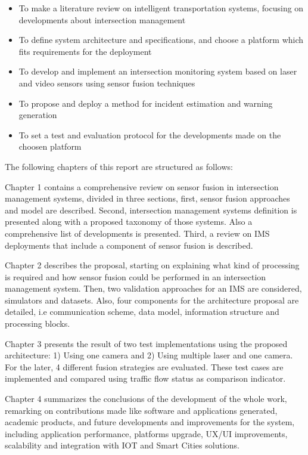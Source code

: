 \begin{itemize}
\item To make a literature review on intelligent transportation systems, focusing on developments about intersection management
\item To define system architecture and specifications, and choose a platform which fits requirements for the deployment
\item To develop and implement an intersection monitoring system based on laser and video sensors using sensor fusion techniques
\item To propose and deploy a method for incident estimation and warning generation
\item To set a test and evaluation protocol for the developments made on the choosen platform 
\end{itemize}


The following chapters of this report are structured as follows:

Chapter 1 contains a comprehensive review on sensor fusion in intersection management systems, divided in three sections, first, sensor fusion approaches and model are described. Second, intersection management systems definition is presented along with a proposed taxonomy of those systems. Also a comprehensive list of developments is presented. Third, a review on IMS deployments that include a component of sensor fusion is described.

Chapter 2 describes the proposal, starting on explaining what kind of processing is required and how sensor fusion could be performed in an intersection management system. Then, two validation approaches for an IMS are considered, simulators and datasets. Also, four components for the architecture proposal are detailed, i.e communication scheme, data model, information structure and processing blocks.

Chapter 3 presents the result of two test implementations using the proposed architecture: 1) Using one camera and 2) Using multiple laser and one camera. For the later, 4 different fusion strategies are evaluated. These test cases are implemented and compared using traffic flow status as comparison indicator.

Chapter 4 summarizes the conclusions of the development of the whole work, remarking on contributions made like software and applications generated, academic products, and future developments and improvements for the system, including application performance, platforms upgrade, UX/UI improvements, scalability and integration with IOT and Smart Cities solutions.
